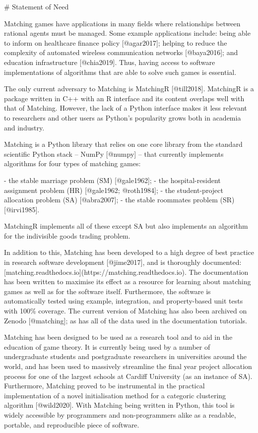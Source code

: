 # Statement of Need

Matching games have applications in many fields where relationships between
rational agents must be managed. Some example applications include: being able
to inform on healthcare finance policy [@agar2017]; helping to reduce the
complexity of automated wireless communication networks [@baya2016]; and
education infrastructure [@chia2019]. Thus, having access to software
implementations of algorithms that are able to solve such games is essential.

The only current adversary to Matching is MatchingR [@till2018]. MatchingR is a
package written in C++ with an R interface and its content overlaps well with
that of Matching. However, the lack of a Python interface makes it less
relevant to researchers and other users as Python's popularity grows both in
academia and industry.

Matching is a Python library that relies on one core library from the
standard scientific Python stack -- NumPy [@numpy] -- that currently implements
algorithms for four types of matching games:

- the stable marriage problem (SM) [@gale1962];
- the hospital-resident assignment problem (HR) [@gale1962; @roth1984];
- the student-project allocation problem (SA) [@abra2007];
- the stable roommates problem (SR) [@irvi1985].

MatchingR implements all of these except SA but also implements an algorithm for
the indivisible goods trading problem.

In addition to this, Matching has been developed to a high degree of best
practice in research software development [@jime2017], and is thoroughly
documented: [matching.readthedocs.io](https://matching.readthedocs.io). The
documentation has been written to maximise its effect as a resource for learning
about matching games as well as for the software itself. Furthermore, the
software is automatically tested using example, integration, and property-based
unit tests with 100\% coverage. The current version of Matching has also been
archived on Zenodo [@matching]; as has all of the data used in the documentation
tutorials.

Matching has been designed to be used as a research tool and to aid in the
education of game theory. It is currently being used by a number of
undergraduate students and postgraduate researchers in universities around the
world, and has been used to massively streamline the final year project
allocation process for one of the largest schools at Cardiff University (as an
instance of SA). Furthermore, Matching proved to be instrumental in the
practical implementation of a novel initialisation method for a categoric
clustering algorithm [@wild2020]. With Matching being written in Python, this
tool is widely accessible by programmers and non-programmers alike as a
readable, portable, and reproducible piece of software.
